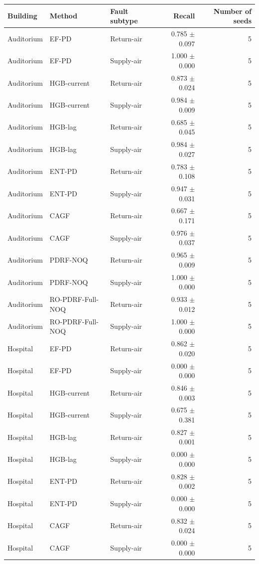 \begin{tabular}{lllrr}
\toprule
Building & Method & Fault subtype & Recall & Number of seeds \\
\midrule
Auditorium & EF-PD & Return-air & 0.785 $\pm$ 0.097 & 5 \\
Auditorium & EF-PD & Supply-air & 1.000 $\pm$ 0.000 & 5 \\
Auditorium & HGB-current & Return-air & 0.873 $\pm$ 0.024 & 5 \\
Auditorium & HGB-current & Supply-air & 0.984 $\pm$ 0.009 & 5 \\
Auditorium & HGB-lag & Return-air & 0.685 $\pm$ 0.045 & 5 \\
Auditorium & HGB-lag & Supply-air & 0.984 $\pm$ 0.027 & 5 \\
Auditorium & ENT-PD & Return-air & 0.783 $\pm$ 0.108 & 5 \\
Auditorium & ENT-PD & Supply-air & 0.947 $\pm$ 0.031 & 5 \\
Auditorium & CAGF & Return-air & 0.667 $\pm$ 0.171 & 5 \\
Auditorium & CAGF & Supply-air & 0.976 $\pm$ 0.037 & 5 \\
Auditorium & PDRF-NOQ & Return-air & 0.965 $\pm$ 0.009 & 5 \\
Auditorium & PDRF-NOQ & Supply-air & 1.000 $\pm$ 0.000 & 5 \\
Auditorium & RO-PDRF-Full-NOQ & Return-air & 0.933 $\pm$ 0.012 & 5 \\
Auditorium & RO-PDRF-Full-NOQ & Supply-air & 1.000 $\pm$ 0.000 & 5 \\
Hospital & EF-PD & Return-air & 0.862 $\pm$ 0.020 & 5 \\
Hospital & EF-PD & Supply-air & 0.000 $\pm$ 0.000 & 5 \\
Hospital & HGB-current & Return-air & 0.846 $\pm$ 0.003 & 5 \\
Hospital & HGB-current & Supply-air & 0.675 $\pm$ 0.381 & 5 \\
Hospital & HGB-lag & Return-air & 0.827 $\pm$ 0.001 & 5 \\
Hospital & HGB-lag & Supply-air & 0.000 $\pm$ 0.000 & 5 \\
Hospital & ENT-PD & Return-air & 0.828 $\pm$ 0.002 & 5 \\
Hospital & ENT-PD & Supply-air & 0.000 $\pm$ 0.000 & 5 \\
Hospital & CAGF & Return-air & 0.832 $\pm$ 0.024 & 5 \\
Hospital & CAGF & Supply-air & 0.000 $\pm$ 0.000 & 5 \\

\end{tabular}
